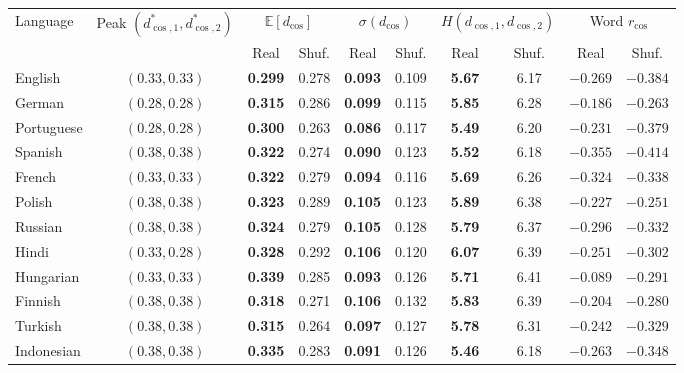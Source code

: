 \documentclass{interact}
\begin{document}
\begin{table}[htbp]
{\begin{tabular}{lccccccccc}
\toprule
Language & Peak $(d_{\cos,1}^*, d_{\cos,2}^*)$ & \multicolumn{2}{c}{$\mathbb{E}[d_{\cos}]$} & \multicolumn{2}{c}{$\sigma(d_{\cos})$} & \multicolumn{2}{c}{$H(d_{\cos,1}, d_{\cos,2})$} & \multicolumn{2}{c}{Word $r_{\cos}$} \\
\cmidrule(lr){3-4} \cmidrule(lr){5-6} \cmidrule(lr){7-8} \cmidrule(lr){9-10}
 & & Real & Shuf. & Real & Shuf. & Real & Shuf. & Real & Shuf. \\
\midrule
English    & $(0.33, 0.33)$ & \textbf{0.299} & 0.278 & \textbf{0.093} & 0.109 & \textbf{5.67} & 6.17 & $-0.269$ & $-0.384$ \\
German     & $(0.28, 0.28)$ & \textbf{0.315} & 0.286 & \textbf{0.099} & 0.115 & \textbf{5.85} & 6.28 & $-0.186$ & $-0.263$ \\
Portuguese & $(0.28, 0.28)$ & \textbf{0.300} & 0.263 & \textbf{0.086} & 0.117 & \textbf{5.49} & 6.20 & $-0.231$ & $-0.379$ \\
Spanish    & $(0.38, 0.38)$ & \textbf{0.322} & 0.274 & \textbf{0.090} & 0.123 & \textbf{5.52} & 6.18 & $-0.355$ & $-0.414$ \\
French     & $(0.33, 0.33)$ & \textbf{0.322} & 0.279 & \textbf{0.094} & 0.116 & \textbf{5.69} & 6.26 & $-0.324$ & $-0.338$ \\
Polish     & $(0.38, 0.38)$ & \textbf{0.323} & 0.289 & \textbf{0.105} & 0.123 & \textbf{5.89} & 6.38 & $-0.227$ & $-0.251$ \\
Russian    & $(0.38, 0.38)$ & \textbf{0.324} & 0.279 & \textbf{0.105} & 0.128 & \textbf{5.79} & 6.37 & $-0.296$ & $-0.332$ \\
Hindi      & $(0.33, 0.28)$ & \textbf{0.328} & 0.292 & \textbf{0.106} & 0.120 & \textbf{6.07} & 6.39 & $-0.251$ & $-0.302$ \\
Hungarian  & $(0.33, 0.33)$ & \textbf{0.339} & 0.285 & \textbf{0.093} & 0.126 & \textbf{5.71} & 6.41 & $-0.089$ & $-0.291$ \\
Finnish    & $(0.38, 0.38)$ & \textbf{0.318} & 0.271 & \textbf{0.106} & 0.132 & \textbf{5.83} & 6.39 & $-0.204$ & $-0.280$ \\
Turkish    & $(0.38, 0.38)$ & \textbf{0.315} & 0.264 & \textbf{0.097} & 0.127 & \textbf{5.78} & 6.31 & $-0.242$ & $-0.329$ \\
Indonesian & $(0.38, 0.38)$ & \textbf{0.335} & 0.283 & \textbf{0.091} & 0.126 & \textbf{5.46} & 6.18 & $-0.263$ & $-0.348$ \\

\end{tabular}}
\end{table}
\end{document}
